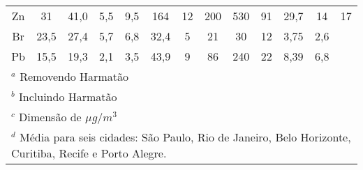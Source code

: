 \begin{tabular}{ccccccccccccc}
Zn        & 31         & 41,0       & 5,5              & 9,5  &164    & 12     & 200   & 530   & 91    & 29,7   & 14      & 17    \\
Br        & 23,5       & 27,4       & 5,7              & 6,8  &32,4   & 5      & 21    & 30    & 12    & 3,75   & 2,6     &       \\
Pb        & 15,5       & 19,3       & 2,1              & 3,5  &43,9   & 9      & 86    & 240   & 22    & 8,39   & 6,8     &       \\
\hline
\multicolumn{13}{l}{$^a$ Removendo Harmatão} \\
\multicolumn{13}{l}{$^b$ Incluindo Harmatão} \\
\multicolumn{13}{l}{$^c$ Dimensão de $\mu g / m^3$ } \\
\multicolumn{13}{l}{$^d$ Média para seis cidades: São Paulo, Rio de Janeiro, 
Belo Horizonte, Curitiba, Recife e Porto Alegre. } \\
\hline
\end{tabular}

